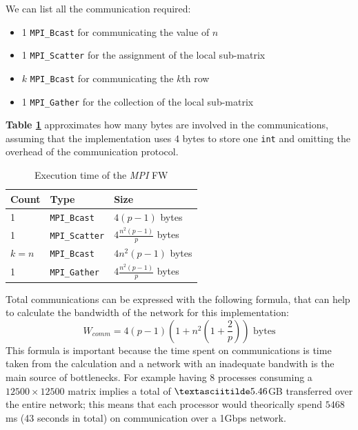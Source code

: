 We can list all the communication required:
\begin{itemize}
\item{1 \texttt{MPI\_Bcast} for communicating the value of $n$}
\item{1 \texttt{MPI\_Scatter} for the assignment of the local sub-matrix}
\item{$k$ \texttt{MPI\_Bcast} for communicating the $k$th row}
\item{1 \texttt{MPI\_Gather} for the collection of the local sub-matrix}
\end{itemize}

\textbf{Table \ref*{tab:comm}} approximates how many bytes are involved in the communications, assuming that
the implementation uses 4 bytes to store one \texttt{int} and omitting the overhead of the communication protocol.
\begin{table}[h!]
\centering
\begin{tabular}{|l|l|l|}
\hline
\rowcolor[HTML]{F56B00} 
{\color[HTML]{FFFFFF} \textbf{Count}} & {\color[HTML]{FFFFFF} \textbf{Type}} & {\color[HTML]{FFFFFF} \textbf{Size}} \\ \hline
1                                     &  \texttt{MPI\_Bcast}                 &  $4(p-1)$ bytes                      \\ \hline
1                                     &  \texttt{MPI\_Scatter}               &  $4\frac{n^2(p-1)}{p}$ bytes         \\ \hline
$k = n$                               &  \texttt{MPI\_Bcast}                 &  $4n^2(p-1)$ bytes                    \\ \hline
1                                     &  \texttt{MPI\_Gather}                &  $4\frac{n^2(p-1)}{p}$ bytes         \\ \hline
\end{tabular}
\caption{Execution time of the \emph{MPI} FW}                                                                                                                                            
\label{tab:comm}
\end{table}
\par

Total communications can be expressed with the following formula, that can help to calculate the bandwidth of the network
for this implementation:
\[W_{comm} = 4(p-1)(1 + n^2(1 + \frac{2}{p})) \text{ bytes}\]
This formula is important because the time spent on communications is time taken from the calculation and a network with an inadequate
bandwith is the main source of bottlenecks. For example having 8 processes consuming a $12500 \times 12500$ matrix implies a total of
$\textasciitilde 5.46$GB transferred  over the entire network; this means that each processor would theorically spend $5468$ms (43 seconds in total) on communication over a 1Gbps network.

